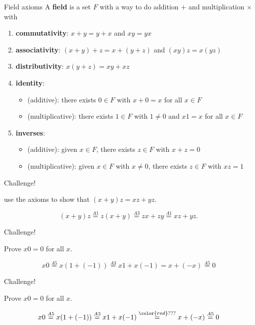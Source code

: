 \documentclass{beamer}
\begin{document}
\begin{frame}{Field axioms}
A \textbf{field} is a set $F$ with a way to do addition $+$ and multiplication $\times$ with
\begin{enumerate}[\text{A}1]
\pause
\item \textbf{commutativity}: $x+y = y+x$ and $xy=yx$
\pause
\item \textbf{associativity}: $(x+y) + z = x + (y+z)$ and $(xy)z = x(yz)$
\pause
\item \textbf{distributivity}: $x(y + z) = xy + xz$
\pause
\item \textbf{identity}: 
\begin{itemize}
\item (additive): there exists $0\in F$ with $x+0=x$ for all $x\in F$
\item (multiplicative): there exists $1\in F$ with $1\neq 0$ and $x1=x$ for all $x\in F$
\end{itemize}
\pause
\item \textbf{inverses}: 
\begin{itemize}
\item (additive): given $x\in F$, there exists $z\in F$ with $x+z=0$
\item (multiplicative): given $x\in F$ with $x\neq 0$, there exists $z\in F$ with $xz=1$
\end{itemize}
\end{enumerate}
\end{frame}

\begin{frame}{Challenge!}
\begin{prob}
use the axioms to show that $(x+y)z = xz + yz$.
\end{prob}
\pause
\begin{soln}
$$(x+y)z \stackrel{A1}{=} z(x+y) \stackrel{A3}{=} zx + zy \stackrel{A1}{=} xz + yz.$$
\end{soln}
\end{frame}

\begin{frame}{Challenge!}
\begin{prob}
Prove $x0 = 0$ for all $x$.
\end{prob}
\pause
\begin{soln}
$$x0 \stackrel{A5}{=} x(1+(-1)) \stackrel{A3}{=} x1+x(-1) = x + (-x)  \stackrel{A5}{=} 0$$
\end{soln}
\end{frame}

\begin{frame}{Challenge!}
\begin{prob}
Prove $x0 = 0$ for all $x$.
\end{prob}
\begin{soln}
$$x0 \stackrel{A5}{=} x(1+(-1)) \stackrel{A3}{=} x1+x(-1) \stackrel{{\color{red}???}}{=} x + (-x)  \stackrel{A5}{=} 0$$
\end{soln}
\end{frame}
\end{document}
